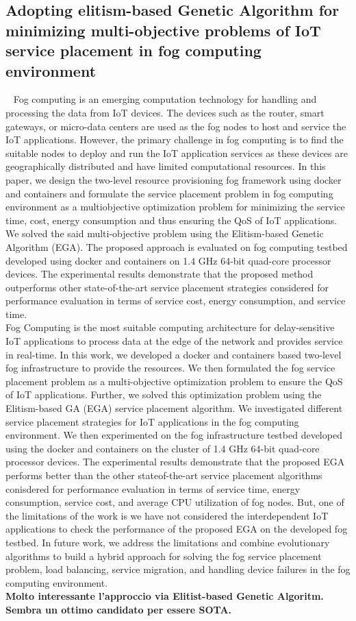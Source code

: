 \subsection{Adopting elitism-based Genetic Algorithm for minimizing multi-objective problems of IoT service placement in fog computing environment}~\cite{natesha2021adopting}
Fog computing is an emerging computation technology for handling and processing the data from IoT devices.
The devices such as the router, smart gateways, or micro-data centers are used as the fog nodes to host and
service the IoT applications. However, the primary challenge in fog computing is to find the suitable nodes to
deploy and run the IoT application services as these devices are geographically distributed and have limited
computational resources. In this paper, we design the two-level resource provisioning fog framework using
docker and containers and formulate the service placement problem in fog computing environment as a multiobjective 
optimization problem for minimizing the service time, cost, energy consumption and thus ensuring the
QoS of IoT applications. We solved the said multi-objective problem using the Elitism-based Genetic Algorithm
(EGA). The proposed approach is evaluated on fog computing testbed developed using docker and containers on
1.4 GHz 64-bit quad-core processor devices. The experimental results demonstrate that the proposed method
outperforms other state-of-the-art service placement strategies considered for performance evaluation in terms of
service cost, energy consumption, and service time. \\

Fog Computing is the most suitable computing architecture for
delay-sensitive IoT applications to process data at the edge of the
network and provides service in real-time. In this work, we developed a
docker and containers based two-level fog infrastructure to provide the
resources. We then formulated the fog service placement problem as a
multi-objective optimization problem to ensure the QoS of IoT
applications. Further, we solved this optimization problem using the
Elitism-based GA (EGA) service placement algorithm. We investigated
different service placement strategies for IoT applications in the fog
computing environment. We then experimented on the fog infrastructure testbed developed using the docker and containers on the cluster of
1.4 GHz 64-bit quad-core processor devices. The experimental results
demonstrate that the proposed EGA performs better than the other stateof-the-art service placement algorithms conisdered for performance
evaluation in terms of service time, energy consumption, service cost,
and average CPU utilization of fog nodes. But, one of the limitations of
the work is we have not considered the interdependent IoT applications
to check the performance of the proposed EGA on the developed fog
testbed. In future work, we address the limitations and combine evolutionary algorithms to build a hybrid approach for solving the fog service
placement problem, load balancing, service migration, and handling
device failures in the fog computing environment. \\
\textbf{Molto interessante l'approccio via Elitist-based Genetic Algoritm. Sembra un ottimo candidato per essere SOTA.} 


